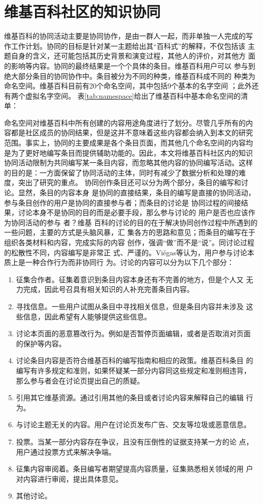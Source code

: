 \section{维基百科社区的知识协同}
维基百科的协同活动主要是协同协作，是由一群人一起，而非单独一人完成的写
作工作计划。协同的目标是针对某一主题给出其“百科式”的解释，不仅包括该
主题自身的含义，还可能包括其历史背景和演变过程，其他人的评价，对其他方
面的影响等内容。协同的最终结果是一个个具体的条目。维基百科用户可以
参与到绝大部分条目的协同协作中。条目被分为不同的种类，维基百科成不同的
种类为命名空间。维基百科目前有20个命名空间，其中包括9个基本的名字空间
；此外还有两个虚拟名字空间。
表\ref{tab:namespace}给出了维基百科中基本命名空间的清单：


命名空间对维基百科中所有创建的内容用途角度进行了划分。尽管几乎所有的内
容都是社区成员的协同结果，但是这并不意味着这些内容都会纳入到本文的研究
范围。事实上，协同的主要成果是各个条目页面，而其他几个命名空间的内容均
是为了更好地编写条目而提供辅助功能的。因此，本文将维基百科社区内的知识
协同活动限制为共同编写某一条目内容，而忽略其他内容的协同编写活动。这样
的目的是：一方面保留了协同活动的主体，同时有减少了数据分析和处理的难
度，突出了研究的重点。
协同创作条目还可以分为两个部分，条目的编写和讨论。显然，条目的内容本身
是协同的直接结果，条目的编写是直接的协同活动，参与条目创作的用户是协同的直接参与者；而条目的讨论是
协同过程的间接结果，讨论本身不是协同的目的而是必要手段，那么参与讨论的
用户是否也应该作为协同活动的参与
者？维基
百科的讨论的目的在于解决协同创作过程中所遇到的一些问题，主要的方式是头脑风暴，汇
集各方的思路和意见；而条目的编写在于组织各类材料和内容，完成实际的内容
创作，强调“做”而不是“说”。同讨论过程的松散性不同，内容编写是非常正
式、严谨的。Viégas等认为，用户参与讨论本质上是一种合作行为而非协同行
为。讨论的内容可以分为以下几个部分：
\begin{enumerate}
\item 征集合作者。征集着意识到条目内容本身还有不完善的地方，但是个人又
  无力完成，因此号召具有相关知识的人补充完善条目内容。
\item 寻找信息。一些用户试图从条目中寻找相关信息，但是条目内容并未涉及
  这些信息，因此希望有人能够提供这些信息。
\item 讨论本页面的恶意篡改行为。例如是否暂停页面编辑，或者是否取消对页面
  的保护等内容。
\item 讨论条目内容是否符合维基百科的编写指南和相应的政策。维基百科条目
  的编写有许多规定和准则，如果怀疑某一部分内容同这些规定和准则相违背，
  那么参与者会在讨论页提出自己的质疑。
\item 引用其它维基资源。通过引用其他的条目或者讨论内容来解释自己的编辑
  行为。
\item 与讨论主题无关的内容。用户在讨论页发布广告、交友等垃圾或恶意信息。
\item 投票。当某一部分内容存在争议，且没有压倒性的证据支持某一方的论
  点，用户通过投票方式来解决争端。
\item 征集内容审阅着。条目编写者期望提高内容质量，征集熟悉相关领域的用
  户对内容进行审阅，提出具体意见。
\item 其他讨论。

\end{enumerate}
